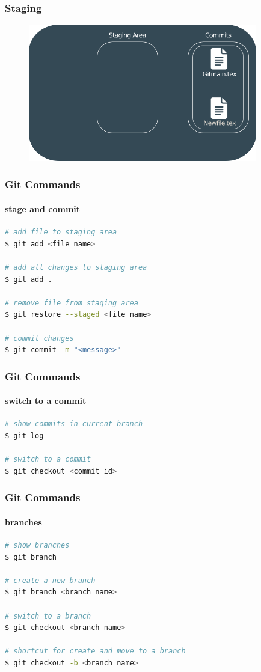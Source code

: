 \documentclass{beamer}
\begin{document}
	\begin{frame}
		\frametitle{Staging}
		\begin{figure}[htbp]
			\centering
			\includegraphics[width=10cm]{staging12}
		\end{figure}
	\end{frame}
	
	\begin{frame}[fragile]
		\frametitle{Git Commands}
		\framesubtitle{stage and commit}	
		
\begin{lstlisting}[language=bash]
# add file to staging area
$ git add <file name>

# add all changes to staging area
$ git add .

# remove file from staging area
$ git restore --staged <file name>

# commit changes
$ git commit -m "<message>"
\end{lstlisting}
	
	\end{frame}
	
	\begin{frame}[fragile]
		\frametitle{Git Commands}
		\framesubtitle{switch to a commit}	
		
\begin{lstlisting}[language=bash]
# show commits in current branch
$ git log

# switch to a commit
$ git checkout <commit id>
\end{lstlisting}
	
	\end{frame}
	
	\begin{frame}[fragile]
		\frametitle{Git Commands}
		\framesubtitle{branches}	
		
\begin{lstlisting}[language=bash]
# show branches
$ git branch

# create a new branch
$ git branch <branch name>

# switch to a branch
$ git checkout <branch name>

# shortcut for create and move to a branch
$ git checkout -b <branch name>
\end{lstlisting}
	
	\end{frame}
\end{document}
